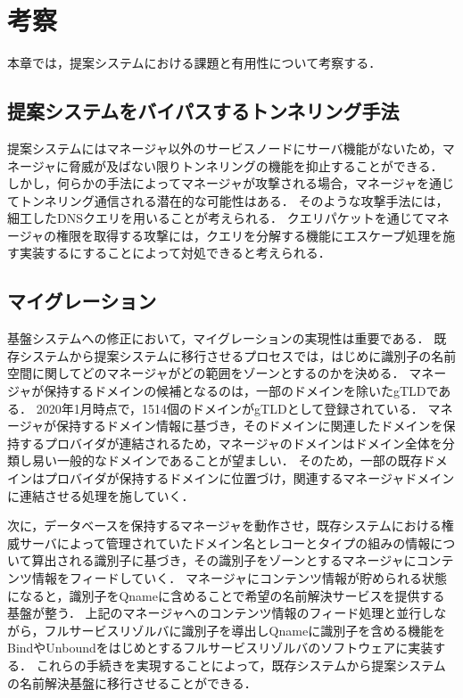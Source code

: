 \section{考察}
\label{sec:discussion}
本章では，提案システムにおける課題と有用性について考察する．

\subsection{提案システムをバイパスするトンネリング手法}
提案システムにはマネージャ以外のサービスノードにサーバ機能がないため，マネージャに脅威が及ばない限りトンネリングの機能を抑止することができる．
しかし，何らかの手法によってマネージャが攻撃される場合，マネージャを通じてトンネリング通信される潜在的な可能性はある．
そのような攻撃手法には，細工したDNSクエリを用いることが考えられる．
クエリパケットを通じてマネージャの権限を取得する攻撃には，クエリを分解する機能にエスケープ処理を施す実装するにすることによって対処できると考えられる．

\subsection{マイグレーション}
基盤システムへの修正において，マイグレーションの実現性は重要である．
既存システムから提案システムに移行させるプロセスでは，はじめに識別子の名前空間に関してどのマネージャがどの範囲をゾーンとするのかを決める．
マネージャが保持するドメインの候補となるのは，一部のドメインを除いたgTLDである．
2020年1月時点で，1514個のドメインがgTLDとして登録されている．
マネージャが保持するドメイン情報に基づき，そのドメインに関連したドメインを保持するプロバイダが連結されるため，マネージャのドメインはドメイン全体を分類し易い一般的なドメインであることが望ましい．
そのため，一部の既存ドメインはプロバイダが保持するドメインに位置づけ，関連するマネージャドメインに連結させる処理を施していく．

次に，データベースを保持するマネージャを動作させ，既存システムにおける権威サーバによって管理されていたドメイン名とレコーとタイプの組みの情報について算出される識別子に基づき，その識別子をゾーンとするマネージャにコンテンツ情報をフィードしていく．
マネージャにコンテンツ情報が貯められる状態になると，識別子をQnameに含めることで希望の名前解決サービスを提供する基盤が整う．
上記のマネージャへのコンテンツ情報のフィード処理と並行しながら，フルサービスリゾルバに識別子を導出しQnameに識別子を含める機能をBindやUnboundをはじめとするフルサービスリゾルバのソフトウェアに実装する．
これらの手続きを実現することによって，既存システムから提案システムの名前解決基盤に移行させることができる．


